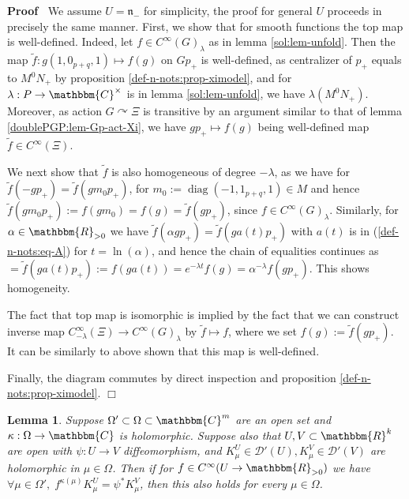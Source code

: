 \documentclass[12pt]{article}
\newcommand{\assign}{:=}
\newcommand{\tmop}[1]{\ensuremath{\operatorname{#1}}}
\renewenvironment{proof}{\noindent\textbf{Proof\ }}{\hspace*{\fill}$\Box$\medskip}
\newtheorem{lemma}[proposition]{Lemma}
\theoremstyle{remark}
\begin{document}
\begin{proof}
  We assume $U =\mathfrak{n}_-$ for simplicity, the proof for general $U$
  proceeds in precisely the same manner. First, we show that for smooth
  functions the top map is well-defined. Indeed, let $f \in C^{\infty}
  (G)_{\lambda} $ as in lemma \ref{sol:lem-unfold}. Then the map $\tilde{f} :
  g (1, 0_{p + q}, 1) \mapsto f (g)$ on $G p_+$ is well-defined, as
  centralizer of $p_+$ equals to $M^0 N_+$ by proposition
  \ref{def-n-nots:prop-ximodel}, and for $\lambda : P \rightarrow
  \mathbbm{C}^{\times}$ is in lemma \ref{sol:lem-unfold}, we have $\lambda
  (M^0 N_+)$. Moreover, as action $G \curvearrowright \Xi$ is transitive by an
  argument similar to that of lemma \ref{doublePGP:lem-Gp-act-Xi}, we have $g
  p_+ \mapsto f (g)$ being well-defined map $\tilde{f} \in C^{\infty} (\Xi)$.
  
  We next show that $\tilde{f}$ is also homogeneous of degree $- \lambda$, as
  we have for $\tilde{f} (- g p_+) = \tilde{f} (g m_0 p_+)$, for $m_0 \assign
  \tmop{diag} (- 1, 1_{p + q}, 1) \in M$ and hence $\tilde{f} (g m_0 p_+)
  \assign f (g m_0) = f (g) = \tilde{f} (g p_+)$, since $f \in C^{\infty}
  (G)_{\lambda}$. Similarly, for $\alpha \in \mathbbm{R}_{> 0}$ we have
  $\tilde{f} (\alpha g p_+) = \tilde{f} (g a (t) p_+)$ with $a (t)$ is in
  (\ref{def-n-nots:eq-A}) for $t = \ln (\alpha)$, and hence the chain of
  equalities continues as $= \tilde{f} (g a (t) p_+) \assign f (g a (t)) =
  e^{- \lambda t} f (g) = \alpha^{- \lambda} f (g p_+)$. This shows
  homogeneity.
  
  The fact that top map is isomorphic is implied by the fact that we can
  construct inverse map $C^{\infty}_{- \lambda} (\Xi) \rightarrow C^{\infty}
  (G)_{\lambda}$ by $\tilde{f} \mapsto f$, where we set $f (g) \assign
  \tilde{f} (g p_+)$. It can be similarly to above shown that this map is
  well-defined.
  
  Finally, the diagram commutes by direct inspection and proposition
  \ref{def-n-nots:prop-ximodel}.
\end{proof}

\begin{lemma}
  \label{sol:lem-holodep}Suppose $\Omega' \subset \Omega \subset
  \mathbbm{C}^m$ are an open set and $\kappa : \Omega \rightarrow \mathbbm{C}$
  is holomorphic. Suppose also that $U, V \subset \mathbbm{R}^k$ are open with
  $\psi : U \rightarrow V$ diffeomorphism, and $K_{\mu}^U \in \mathcal{D}'
  (U), K^V_{\mu} \in \mathcal{D}' (V)$ are holomorphic in $\mu \in \Omega$.
  Then if for $f \in C^{\infty} (U \rightarrow \mathbbm{R}_{> 0})$ we have
  $\forall \mu \in \Omega', \; f^{\kappa (\mu)} K^U_{\mu} = \psi^{\ast}
  K^V_{\mu}$, then this also holds for every $\mu \in \Omega$.
\end{lemma}
\end{document}
